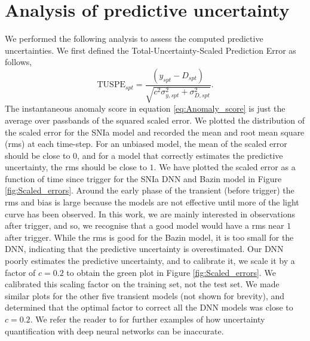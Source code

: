 \documentclass[fleqn,usenatbib]{mnras}
\begin{document}
\section{Analysis of predictive uncertainty}
\label{sec:Appendix_analysis_of_predictive_uncertainty}
We performed the following analysis to assess the computed predictive uncertainties. We first defined the Total-Uncertainty-Scaled Prediction Error as follows,
\begin{equation}
        \mathrm{TUSPE}_{spt} = \frac{(y_{spt} - D_{spt})} {\sqrt{c^2\sigma_{y,{spt}}^2 + \sigma_{D,{spt}}^2}}.
\label{eq:scaled_error}
\end{equation}
The instantaneous anomaly score in equation \ref{eq:Anomaly_score} is just the average over passbands of the squared scaled error. We plotted the distribution of the scaled error for the SNIa model and recorded the mean and root mean square (rms) at each time-step. For an unbiased model, the mean of the scaled error should be close to $0$, and for a model that correctly estimates the predictive uncertainty, the rms should be close to $1$. We have plotted the scaled error as a function of time since trigger for the SNIa DNN and Bazin model in Figure \ref{fig:Scaled_errors}. Around the early phase of the transient (before trigger) the rms and bias is large because the models are not effective until more of the light curve has been observed. In this work, we are mainly interested in observations after trigger, and so, we recognise that a good model would have a rms near $1$ after trigger. While the rms is good for the Bazin model, it is too small for the DNN, indicating that the predictive uncertainty is overestimated. Our DNN poorly estimates the predictive uncertainty, and to calibrate it, we scale it by a factor of $c=0.2$ to obtain the green plot in Figure \ref{fig:Scaled_errors}. We calibrated this scaling factor on the training set, not the test set. We made similar plots for the other five transient models (not shown for brevity), and determined that the optimal factor to correct all the DNN models was close to $c=0.2$. We refer the reader to \citet{Caldeira_Nord2020} for further examples of how uncertainty quantification with deep neural networks can be inaccurate. 
\end{document}
